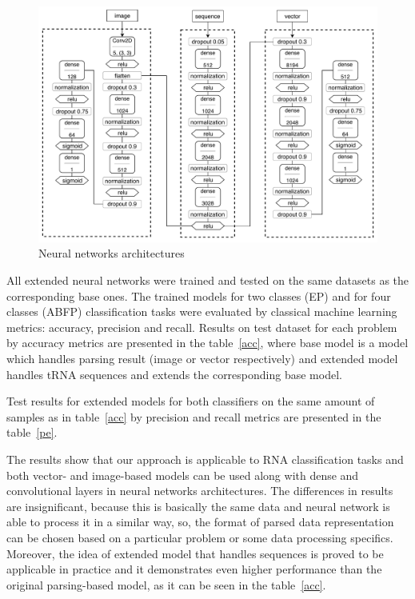 \documentclass[12pt,a4paper]{cibb}
\begin{document}
\begin{figure}[h]
\begin{center}
\centering
\includegraphics[width=14cm]{nn_arch.pdf}
\caption{Neural networks architectures}
\label{nn}
\end{center}
\end{figure}   


All extended neural networks were trained and tested on the same datasets as the corresponding base ones. The trained models for two classes (EP) and for four classes (ABFP) classification tasks were evaluated by classical machine learning metrics: accuracy, precision and recall.
Results on test dataset for each problem by accuracy metrics are presented in the table~\ref{acc}, where base model is a model which handles parsing result (image or vector respectively) and extended model handles tRNA sequences and extends the corresponding base model.



Test results for extended models for both classifiers on the same amount of samples as in table~\ref{acc} by precision and recall metrics  are presented in the table~\ref{pe}.




The results show that our approach is applicable to RNA classification tasks and both vector- and image-based models can be used along with dense and convolutional layers in neural networks architectures.
The differences in results are insignificant, because this is basically the same data and neural network is able to process it in a similar way, so, the format of parsed data representation can be chosen based on a particular problem or some data processing specifics.
Moreover, the idea of extended model that handles sequences is proved to be applicable in practice and it demonstrates even higher performance than the original parsing-based model, as it can be seen in the table~\ref{acc}.
\end{document}
